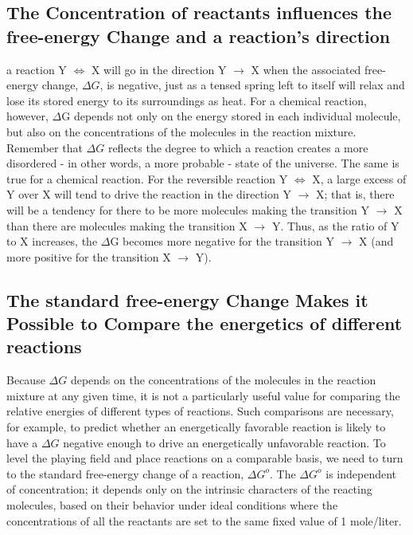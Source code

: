 \subsection{The Concentration of reactants influences the free-energy Change and a reaction’s direction}

a reaction Y $\Longleftrightarrow$ X will go in the direction Y $\rightarrow$ X
when the associated free-energy change, $\Delta G$, is negative, just as a tensed
spring left to itself will relax and lose its stored energy to its surroundings
as heat. For a chemical reaction, however, $\Delta$G depends not only on the
energy stored in each individual molecule, but also on the concentrations
of the molecules in the reaction mixture. Remember that $\Delta G$ reflects the
degree to which a reaction creates a more disordered - in other words, a
more probable - state of the universe.
The same is true for a chemical reaction. For the reversible reaction Y $\Longleftrightarrow$
X, a large excess of Y over X will tend to drive the reaction in the direction
Y $\rightarrow$ X; that is, there will be a tendency for there to be more molecules
making the transition Y $\rightarrow$ X than there are molecules making the transition
X $\rightarrow$ Y. Thus, as the ratio of Y to X increases, the $\Delta$G becomes more negative
for the transition Y $\rightarrow$ X (and more positive for the transition X $\rightarrow$ Y).

\subsection{The standard free-energy Change Makes it Possible to Compare the energetics of different reactions}

Because $\Delta G$ depends on the concentrations of the molecules in the reaction
mixture at any given time, it is not a particularly useful value for
comparing the relative energies of different types of reactions. Such comparisons
are necessary, for example, to predict whether an energetically
favorable reaction is likely to have a $\Delta G$ negative enough to drive an
energetically unfavorable reaction. To level the playing field and place
reactions on a comparable basis, we need to turn to the standard free-energy
change of a reaction, $\Delta G^{o}$. The $\Delta G^{o}$ is independent of concentration; it
depends only on the intrinsic characters of the reacting molecules, based
on their behavior under ideal conditions where the concentrations of all
the reactants are set to the same fixed value of 1 mole/liter.

